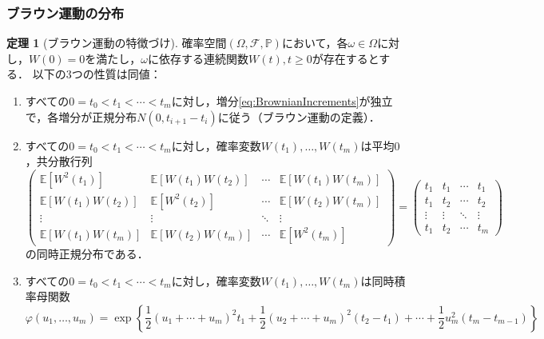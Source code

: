 \documentclass[a4paper, lualatex, ja=standard]{bxjsarticle}
\theoremstyle{definition}
\newtheorem{thm}{定理}
\begin{document}
\subsubsection{ブラウン運動の分布}
\begin{thm}[ブラウン運動の特徴づけ]
  確率空間$(\Omega,\mathcal{F},\mathbb{P})$において，各$\omega\in\Omega$に対し，$W(0)=0$を満たし，$\omega$に依存する連続関数$W(t),t\geq0$が存在するとする．
  以下の3つの性質は同値：
  \begin{enumerate}
    \item すべての$0=t_0<t_1<\cdots<t_m$に対し，増分\eqref{eq:BrownianIncrements}が独立で，各増分が正規分布$N(0,t_{i+1}-t_i)$に従う（ブラウン運動の定義）．
    \item すべての$0=t_0<t_1<\cdots<t_m$に対し，確率変数$W(t_1),\ldots,W(t_m)$は平均$0$，共分散行列
    \begin{equation}
      \begin{pmatrix}
        \mathbb{E}[W^2(t_1)] & \mathbb{E}[W(t_1)W(t_2)] & \cdots & \mathbb{E}[W(t_1)W(t_m)] \\
        \mathbb{E}[W(t_1)W(t_2)] & \mathbb{E}[W^2(t_2)] & \cdots & \mathbb{E}[W(t_2)W(t_m)] \\
        \vdots & \vdots & \ddots & \vdots \\
        \mathbb{E}[W(t_1)W(t_m)] & \mathbb{E}[W(t_2)W(t_m)] & \cdots & \mathbb{E}[W^2(t_m)]
      \end{pmatrix}
      =
      \begin{pmatrix}
        t_1 & t_1 & \cdots & t_1 \\
        t_1 & t_2 & \cdots & t_2 \\
        \vdots & \vdots & \ddots & \vdots \\
        t_1 & t_2 & \cdots & t_m
      \end{pmatrix}
    \end{equation}
    の同時正規分布である．
    \item すべての$0=t_0<t_1<\cdots<t_m$に対し，確率変数$W(t_1),\ldots,W(t_m)$は同時積率母関数
    \begin{equation}
      \varphi(u_1,\ldots,u_m)=\exp\left\{\frac{1}{2}(u_1+\cdots+u_m)^2t_1+\frac{1}{2}(u_2+\cdots+u_m)^2(t_2-t_1)+\cdots+\frac{1}{2}u_m^2(t_m-t_{m-1})\right\}
    \end{equation}
  \end{enumerate}
\end{thm}
\end{document}
